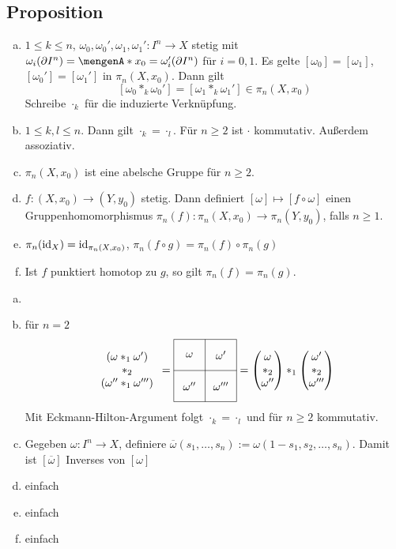 \subsection{Proposition} %
\label{sub:146}
\begin{enumerate}[a)]
	\item $1 \le k \le n$, $\omega_0, \omega_0', \omega_1, \omega_1' : I^n \to X$ stetig mit $\omega_i (\partial I^n) = \set{x_0} = \omega_i'(\partial I^n)$ für $i=0,1$.
	Es gelte $[\omega_0] = [\omega_1]$, $[\omega_0'] = [\omega_1']$ in $\pi_n(X,x_0)$. Dann gilt 
	\[
		[\omega_0 *_k \omega_0'] = [\omega_1 *_k \omega_1'] \in \pi_n(X, x_0)
	\]
	Schreibe $\cdot_k$ für die induzierte Verknüpfung.
	\item $1 \le k,l \le n$. Dann gilt $\cdot_k = \cdot_l$. Für $n \ge 2$ ist $\cdot $ kommutativ. Außerdem assoziativ.
	\item $\pi_n(X,x_0)$ ist eine abelsche Gruppe für $n \ge 2$.
	\item $f : (X,x_0) \to (Y,y_0)$ stetig. Dann definiert $[\omega] \mapsto [f \circ \omega]$ einen Gruppenhomomorphismus $\pi_n(f) : \pi_n(X,x_0) \to \pi_n(Y,y_0)$,
	falls $n \ge 1$.
	\item $\pi_n(\operatorname{id}_X) = \operatorname{id}_{\pi_n(X,x_0)}$, $\pi_n(f \circ g) = \pi_n(f) \circ \pi_n(g)$
	\item Ist $f$ punktiert homotop zu $g$, so gilt $\pi_n(f) = \pi_n(g)$.
\end{enumerate}
\begin{enumerate}[a)]
	\item \checked
	\item für $n=2$
	\[
		\begin{array}{c}
			(\omega *_1 \omega') \\
			*_2 \\
			(\omega'' *_1 \omega''')
			
		\end{array}
		 = 
		\vcenter{\hbox{\begin{tikzpicture}
			\draw (0,0) grid (2,2);
			\node at (0.5,0.5){$\omega''$};
			\node at (0.5,1.5){$\omega$};
			\node at (1.5,0.5){$\omega'''$};
			\node at (1.5,1.5){$\omega'$};
		\end{tikzpicture}}}
		 = \begin{pmatrix}
		 	\omega \\
			*_2 \\
			\omega''
		 \end{pmatrix} *_1
		 \begin{pmatrix}
		 	\omega' \\
			*_2 \\
			\omega'''
		 \end{pmatrix}
	\]
	Mit Eckmann-Hilton-Argument folgt $\cdot_k = \cdot_l$ und für $n \ge 2 $ kommutativ.
	\item Gegeben $\omega : I^n \to X$, definiere $\overline{\omega} (s_1, \ldots , s_n) := \omega (1-s_1, s_2, \ldots , s_n)$. Damit ist $[\overline{\omega}]$ Inverses von
	$[\omega]$
	\item einfach
	\item einfach
	\item einfach \bewende
\end{enumerate}

